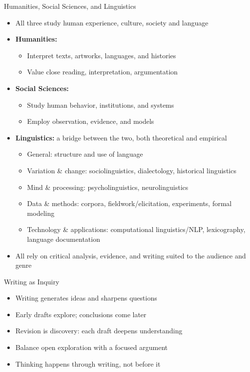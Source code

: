 \documentclass[aspectratio=169]{beamer}
\begin{document}
\begin{frame}{Humanities, Social Sciences, and Linguistics}
\begin{itemize}
  \item All three study human experience, culture, society and language
  \item \textbf{Humanities:}
    \begin{itemize}
      \item Interpret texts, artworks, languages, and histories
      \item Value close reading, interpretation, argumentation
    \end{itemize}
  \item \textbf{Social Sciences:}
    \begin{itemize}
      \item Study human behavior, institutions, and systems
      \item Employ observation, evidence, and models
    \end{itemize}
  \item \textbf{Linguistics:} a bridge between the two, both theoretical and empirical
    \begin{itemize}
      \item General: structure and use of language
      \item Variation \& change: sociolinguistics, dialectology, historical linguistics
      \item Mind \& processing: psycholinguistics, neurolinguistics
      \item Data \& methods: corpora, fieldwork/elicitation, experiments, formal modeling
      \item Technology \& applications: computational linguistics/NLP, lexicography, language documentation
    \end{itemize}
  \item All rely on critical analysis, evidence, and writing suited to the audience and genre
\end{itemize}
\end{frame}


\begin{frame}{Writing as Inquiry}
\begin{itemize}
  \item Writing generates ideas and sharpens questions
  \item Early drafts explore; conclusions come later
  \item Revision is discovery: each draft deepens understanding
  \item Balance open exploration with a focused argument
  \item Thinking happens through writing, not before it
\end{itemize}
\end{frame}
\end{document}
